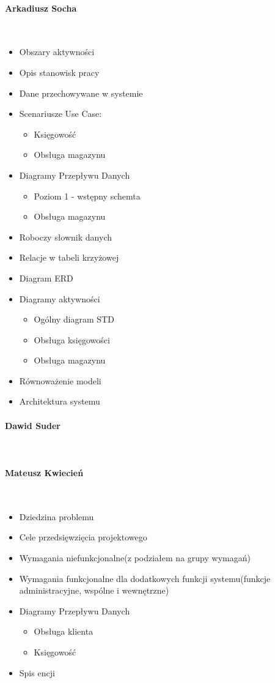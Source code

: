 \documentclass[paper=a4, fontsize=12pt]{scrartcl}
\numberwithin{equation}{section}		%
\numberwithin{figure}{section}			%
\numberwithin{table}{section}				%
\begin{document}
\paragraph{Arkadiusz Socha} \ \\
	\begin{itemize}
		\item Obszary aktywności
		\item Opis stanowisk pracy
		\item Dane przechowywane w systemie
		\item Scenariusze Use Case: 
			\begin{itemize}
				\item Księgowość
				\item Obsługa magazynu
			\end{itemize}
		\item Diagramy Przepływu Danych
			\begin{itemize}
				\item Poziom 1 - wstępny schemta
				\item Obsługa magazynu
			\end{itemize}
		\item Roboczy słownik danych
		\item Relacje w tabeli krzyżowej
		\item Diagram ERD
		\item Diagramy aktywności
			\begin{itemize}
				\item Ogólny diagram STD
				\item Obsługa księgowości
				\item Obsługa magazynu
			\end{itemize}
		\item Równoważenie modeli
		\item Architektura systemu
	\end{itemize}

\paragraph{Dawid Suder} \ \\

\paragraph{Mateusz Kwiecień} \ \\
	\begin{itemize}
		\item Dziedzina problemu
		\item Cele przedsięwzięcia projektowego
		\item Wymagania niefunkcjonalne(z podziałem na grupy wymagań)
		\item Wymagania funkcjonalne dla dodatkowych funkcji systemu(funkcje administracyjne, wspólne i wewnętrzne)
		\item Diagramy Przepływu Danych
			\begin{itemize} 
				\item Obsługa klienta 
				\item Księgowość
			\end{itemize}
		\item Spis encji
	\end{itemize}
\end{document}

